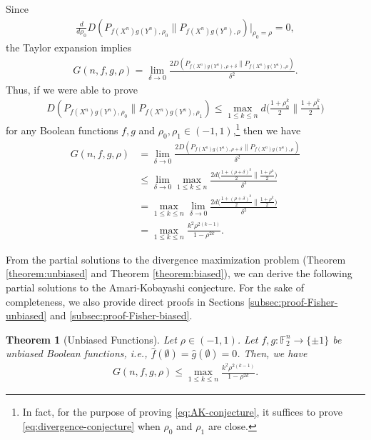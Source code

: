 \documentclass[journal,draftcls, onecolumn]{IEEEtran}
\newtheorem{theorem}{Theorem}
\begin{document}
Since 
\begin{align*}
\frac{d}{d\rho_0} D(P_{f(X^n)g(Y^n),\rho_0} \| P_{f(X^n)g(Y^n),\rho})\bigg|_{\rho_0=\rho} = 0,
\end{align*}
the Taylor expansion implies
\begin{align*}
G(n,f,g,\rho) = \lim_{\delta\to 0} \frac{2 D(P_{f(X^n)g(Y^n),\rho+\delta} \| P_{f(X^n)g(Y^n),\rho})}{\delta^2}.
\end{align*}
Thus, if we were able to prove
\begin{align} \label{eq:divergence-conjecture}
D(P_{f(X^n)g(Y^n),\rho_0} \| P_{f(X^n)g(Y^n),\rho_1}) \le 
\max_{1\le k \le n} d\bigg( \frac{1+\rho_0^k}{2} \bigg\| \frac{1+\rho_1^k}{2} \bigg)
\end{align}
for any Boolean functions $f,g$ and $\rho_0,\rho_1\in (-1,1)$,\footnote{In fact, for the purpose of proving \eqref{eq:AK-conjecture},
it suffices to prove \eqref{eq:divergence-conjecture} when $\rho_0$ and $\rho_1$ are close.} 
then we have
\begin{align*}
G(n,f,g,\rho) &= \lim_{\delta\to 0} \frac{2 D(P_{f(X^n)g(Y^n),\rho+\delta} \| P_{f(X^n)g(Y^n),\rho})}{\delta^2} \\
&\le \lim_{\delta\to 0} \max_{1\le k \le n} \frac{2d\big( \frac{1+(\rho+\delta)^k}{2} \big\| \frac{1+\rho^k}{2} \big)}{\delta^2} \\
&= \max_{1\le k \le n} \lim_{\delta\to 0} \frac{2d\big( \frac{1+(\rho+\delta)^k}{2} \big\| \frac{1+\rho^k}{2} \big)}{\delta^2} \\
&= \max_{1\le k \le n} \frac{k^2 \rho^{2(k-1)}}{1-\rho^{2k}}.
\end{align*}

From the partial solutions to the divergence maximization problem (Theorem \ref{theorem:unbiased} and Theorem \ref{theorem:biased}),
we can derive the following partial solutions to the Amari-Kobayashi conjecture. For the sake of completeness, we also provide direct
proofs in Sections \ref{subsec:proof-Fisher-unbiased} and \ref{subsec:proof-Fisher-biased}.
\begin{theorem}[Unbiased Functions] \label{theorem:Fisher-unbiased}
Let $\rho \in (-1,1)$. Let $f,g:\mathbb{F}_2^n\to\{\pm1\}$ be unbiased Boolean functions, i.e.,
$\widehat{f}(\emptyset)=\widehat{g}(\emptyset)=0$. Then, we have
\begin{align*}
G(n,f,g,\rho) \le \max_{1\le k \le n} \frac{k^2 \rho^{2(k-1)}}{1-\rho^{2k}}.
\end{align*}
\end{theorem}
\end{document}
